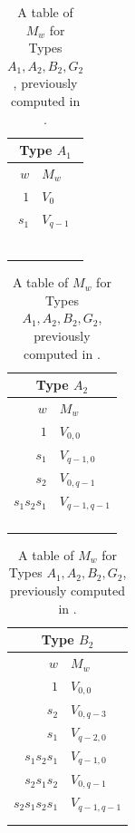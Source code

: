 \documentclass{amsart}
\theoremstyle{definition}
\begin{document}
\clearpage
\begin{table}[t]
\caption{A table of $M_w$ for Types $A_1, A_2, B_2, G_2$, previously computed in \cite[Section 2]{L}.}
\renewcommand{\arraystretch}{1.5}
\begin{tabular}{|r|l|}
\hline
\multicolumn{2}{||c||}{Type $A_1$}\\
\hline $w$ & $M_w$\\
\hline
    $1$ & $V_0$ \\
    $s_1$ & $V_{q-1}$\\
    \hline\multicolumn{2}{c}{}\\
    \multicolumn{2}{c}{}\\
    \multicolumn{2}{c}{}\\
    \multicolumn{2}{c}{}\\
    \multicolumn{2}{c}{}\\
    \multicolumn{2}{c}{}\\
\end{tabular} 
\begin{tabular}{|r|l|}
\hline
\multicolumn{2}{||c||}{Type $A_2$}\\
\hline $w$ & $M_w$\\
\hline
    $1$ & $V_{0,0}$ \\
    $s_1$ & $V_{q-1,0}$\\
    $s_2$ & $V_{0,q-1}$\\
    $s_1s_2s_1$ & $V_{q-1,q-1}$\\
    \hline\multicolumn{2}{c}{}\\
    \multicolumn{2}{c}{}\\
    \multicolumn{2}{c}{}\\
    \multicolumn{2}{c}{}\\
\end{tabular}
\begin{tabular}{|r|l|}
\hline
\multicolumn{2}{||c||}{Type $B_2$}\\
\hline $w$ & $M_w$\\
\hline
    $1$ & $V_{0,0}$ \\
    $s_2$ & $V_{0,q-3}$ \\
    $s_1$ & $V_{q-2,0}$ \\
    $s_1s_2s_1$ & $V_{q-1,0}$ \\
    $s_2s_1s_2$ & $V_{0,q-1}$ \\
    $s_2s_1s_2s_1$ & $V_{q-1,q-1}$\\
    \hline\multicolumn{2}{c}{}\\
    \multicolumn{2}{c}{}\\
\end{tabular}

\end{table}
\end{document}

